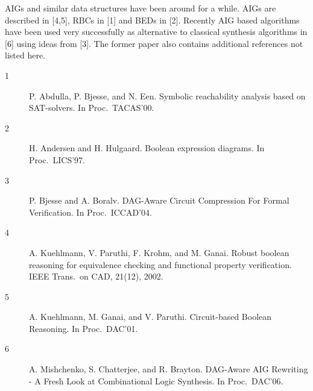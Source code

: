 \documentclass[10pt]{llncs}
\begin{document}
  AIGs and similar data structures have been around for a while.  AIGs are
  described in [4,5], RBCs in [1] and BEDs in [2].  Recently AIG based
  algorithms have been used very successfully as alternative to classical
  synthesis algorithms in [6] using ideas from [3].  The former paper
  also contains additional references not listed here.

\begin{description}

\item[1] P. Abdulla, P. Bjesse, and N. Een.
  Symbolic reachability analysis based on SAT-solvers.
  In Proc.~TACAS'00.

\item[2] H. Andersen and H. Hulgaard. 
  Boolean expression diagrams.
  In Proc.~LICS'97.

\item[3] P. Bjesse and A. Boralv.
  DAG-Aware Circuit Compression For Formal Verification.
  In Proc.~ICCAD'04.

\item[4] A. Kuehlmann, V. Paruthi, F. Krohm, and M. Ganai.
  Robust boolean reasoning for equivalence checking and functional 
  property verification.
  IEEE Trans.~on CAD, 21(12), 2002. 

\item[5] A. Kuehlmann, M. Ganai, and V. Paruthi. 
  Circuit-based Boolean Reasoning. 
  In Proc.~DAC'01.

\item[6] A. Mishchenko, S. Chatterjee, and R. Brayton. 
  DAG-Aware AIG Rewriting - A Fresh Look at Combinational Logic Synthesis. 
  In Proc.~DAC'06. 

\end{description}
\end{document}
